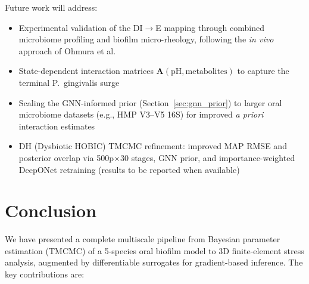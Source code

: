\documentclass[11pt,a4paper]{article}
\begin{document}
Future work will address:
\begin{itemize}
  \item Experimental validation of the DI$\to$E mapping through combined microbiome profiling and biofilm micro-rheology, following the \textit{in vivo} approach of Ohmura et al.~\cite{Ohmura2024}
  \item State-dependent interaction matrices $\mathbf{A}(\mathrm{pH}, \mathrm{metabolites})$ to capture the terminal P.~gingivalis surge
  \item Scaling the GNN-informed prior (Section~\ref{sec:gnn_prior}) to larger oral microbiome datasets (e.g., HMP V3--V5 16S) for improved \textit{a priori} interaction estimates
  \item DH (Dysbiotic HOBIC) TMCMC refinement: improved MAP RMSE and posterior overlap via 500p$\times$30 stages, GNN prior, and importance-weighted DeepONet retraining (results to be reported when available)
\end{itemize}

\section{Conclusion}

We have presented a complete multiscale pipeline from Bayesian parameter estimation (TMCMC) of a 5-species oral biofilm model to 3D finite-element stress analysis, augmented by differentiable surrogates for gradient-based inference.
The key contributions are:
\end{document}
